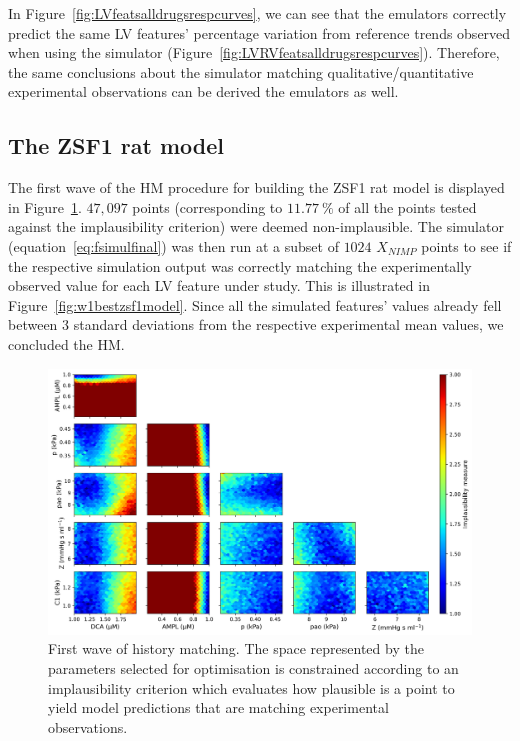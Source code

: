 \vspace{0.2cm}
In Figure~\ref{fig:LVfeatsalldrugsrespcurves}, we can see that the emulators correctly predict the same LV features' percentage variation from reference trends observed when using the simulator (Figure~\ref{fig:LVRVfeatsalldrugsrespcurves}). Therefore, the same conclusions about the simulator matching qualitative/quantitative experimental observations can be derived the emulators as well.


%
%
%
\subsection{The ZSF1 rat model}\label{sec:ch7the_zsf1_rat_model}
The first wave of the HM procedure for building the ZSF1 rat model is displayed in Figure~\ref{fig:w1zsf1rat}. $47,097$ points (corresponding to $\SI{11.77}{\percent}$ of all the points tested against the implausibility criterion) were deemed non-implausible. The simulator (equation~\eqref{eq:fsimulfinal}) was then run at a subset of $1024$ $X_{NIMP}$ points to see if the respective simulation output was correctly matching the experimentally observed value for each LV feature under study. This is illustrated in Figure~\ref{fig:w1bestzsf1model}. Since all the simulated features' values already fell between $3$ standard deviations from the respective experimental mean values, we concluded the HM.

\begin{figure}[ht!]
    \myfloatalign
    \includegraphics[width=\textwidth]{figures/chapter07/wave_1.png}
    \caption{First wave of history matching. The space represented by the parameters selected for optimisation is constrained according to an implausibility criterion which evaluates how plausible is a point to yield model predictions that are matching experimental observations.}  
    \label{fig:w1zsf1rat}
\end{figure}

